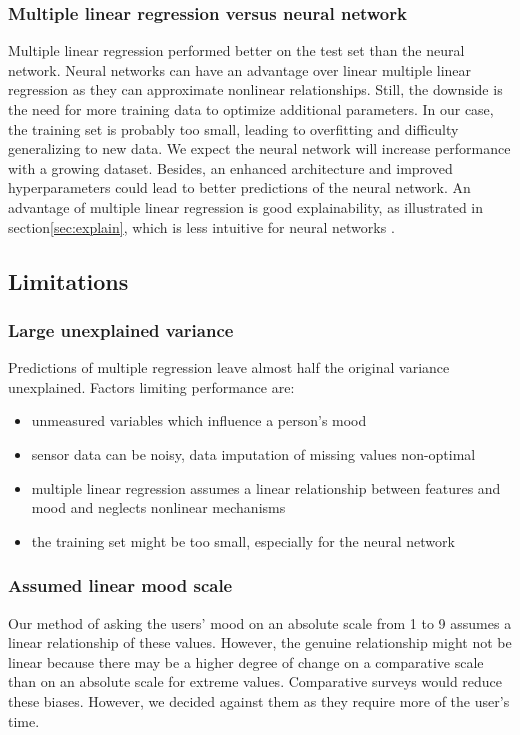 \documentclass[conference]{IEEEtran}
\begin{document}
\subsubsection{Multiple linear regression versus neural network}
Multiple linear regression performed better on the test set than the neural network. Neural networks can have an advantage over linear multiple linear regression as they can approximate nonlinear relationships. Still, the downside is the need for more training data to optimize additional parameters. In our case, the training set is probably too small, leading to overfitting and difficulty generalizing to new data. We expect the neural network will increase performance with a growing dataset.
Besides, an enhanced architecture and improved hyperparameters could lead to better predictions of the neural network.
An advantage of multiple linear regression is good explainability, as illustrated in section\ref{sec:explain}, which is less intuitive for neural networks \cite{samek_explainable_2017}.




\subsection{Limitations}

\subsubsection{Large unexplained variance}
Predictions of multiple regression leave almost half the original variance unexplained. 
Factors limiting performance are:
\begin{itemize}
    \item unmeasured variables which influence a person's mood
    \item sensor data can be noisy, data imputation of missing values non-optimal
    \item multiple linear regression assumes a linear relationship between features and mood and neglects nonlinear mechanisms
    \item the training set might be too small, especially for the neural network
\end{itemize}


\subsubsection{Assumed linear mood scale}
Our method of asking the users' mood on an absolute scale from 1 to 9 assumes a linear relationship of these values. However, the genuine relationship might not be linear because there may be a higher degree of change on a comparative scale than on an absolute scale for extreme values\cite{carlsson_assessment_1983}.
Comparative surveys would reduce these biases. However, we decided against them as they require more of the user's time.
\end{document}
